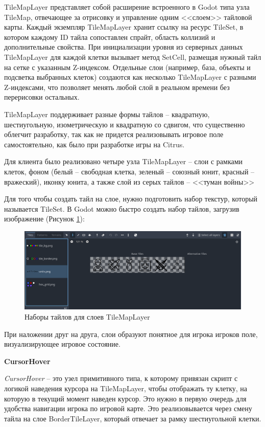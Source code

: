             TileMapLayer представляет собой расширение встроенного в Godot типа узла TileMap, отвечающее за отрисовку и управление одним <<слоем>> тайловой карты. Каждый экземпляр TileMapLayer хранит ссылку на ресурс TileSet, в котором каждому ID тайла сопоставлен спрайт, область коллизий и дополнительные свойства. При инициализации уровня из серверных данных TileMapLayer для каждой клетки вызывает метод SetCell, размещая нужный тайл на сетке с указанным Z-индексом. Отдельные слои (например, база, объекты и подсветка выбранных клеток) создаются как несколько TileMapLayer с разными Z-индексами, что позволяет менять любой слой в реальном времени без перерисовки остальных.

            TileMapLayer поддерживает разные формы тайлов -- квадратную, шестиугольную, изометрическую и квадратную со сдвигом, что существенно облегчит разработку, так как не придется реализовывать игровое поле самостоятельно, как было при разработке игры на Citrus.

            Для клиента было реализовано четыре узла TileMapLayer -- слои с рамками клеток, фоном (белый -- свободная клетка, зеленый -- союзный юнит, красный -- вражеский), иконку юнита, а также слой из серых тайлов -- <<туман войны>>

            Для того чтобы создать тайл на слое, нужно подготовить набор текстур, который называется TileSet. В Godot можно быстро создать набор тайлов, загрузив изображение (Рисунок \ref{ris2.4}):
            \begin{figure}[H]
                \centering
                \includegraphics[width=\textwidth]{pictures/godot_tileset.png}
                \caption{Наборы тайлов для слоев TileMapLayer}\label{ris2.4}
            \end{figure}

            При наложении друг на друга, слои образуют понятное для игрока игроков поле, визуализирующее игровое состояние.

            \textbf{CursorHover}

            \textit{CursorHover} -- это узел примитивного типа, к которому привязан скрипт с логикой наведения курсора на TileMapLayer, чтобы отображать ту клетку, на которую в текущий момент наведен курсор. Это нужно в первую очередь для удобства навигации игрока по игровой карте. Это реализовывается через смену тайла на слое BorderTileLayer, который отвечает за рамку шестиугольной клетки.

